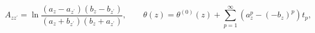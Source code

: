 \begin{equation}
A_{zz^\prime}=\ln\frac{(a_z-a_{z^\prime})(b_z-b_{z^\prime})}
{(a_z+b_{z^\prime})(b_z+a_{z^\prime})}, \qquad
\theta(z)=\theta^{(0)}(z)+\sum_{p=1}^\infty(a_z^p-(-b_z)^p)t_p,
\label{kp}\end{equation}

